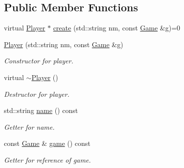 \subsection*{Public Member Functions}
\begin{DoxyCompactItemize}
\item 
virtual \mbox{\hyperlink{class_player}{Player}} $\ast$ \mbox{\hyperlink{class_player_a9b9133f3347894da1416953048cecdb2}{create}} (std\+::string nm, const \mbox{\hyperlink{class_game}{Game}} \&g)=0
\item 
\mbox{\label{class_player_adebc0e1afa34a20c0be570f8e9e3a9bf}} 
\mbox{\hyperlink{class_player_adebc0e1afa34a20c0be570f8e9e3a9bf}{Player}} (std\+::string nm, const \mbox{\hyperlink{class_game}{Game}} \&g)
\begin{DoxyCompactList}\small\item\em Constructor for player. \end{DoxyCompactList}\item 
\mbox{\label{class_player_a8981c201ffb2270c0b6dbd467b627376}} 
virtual \mbox{\hyperlink{class_player_a8981c201ffb2270c0b6dbd467b627376}{$\sim$\+Player}} ()
\begin{DoxyCompactList}\small\item\em Destructor for player. \end{DoxyCompactList}\item 
\mbox{\label{class_player_a422139ad63182cfc9f82305b87a3f9a5}} 
std\+::string \mbox{\hyperlink{class_player_a422139ad63182cfc9f82305b87a3f9a5}{name}} () const
\begin{DoxyCompactList}\small\item\em Getter for name. \end{DoxyCompactList}\item 
\mbox{\label{class_player_ab4ef841709083fe60f6647ce0a7ca816}} 
const \mbox{\hyperlink{class_game}{Game}} \& \mbox{\hyperlink{class_player_ab4ef841709083fe60f6647ce0a7ca816}{game}} () const
\begin{DoxyCompactList}\small\item\em Getter for reference of game. \end{DoxyCompactList}\item 
\mbox{\label{class_player_a47c5497b2d8bf5d745e85952d0bf097f}} 

\end{DoxyCompactItemize}
